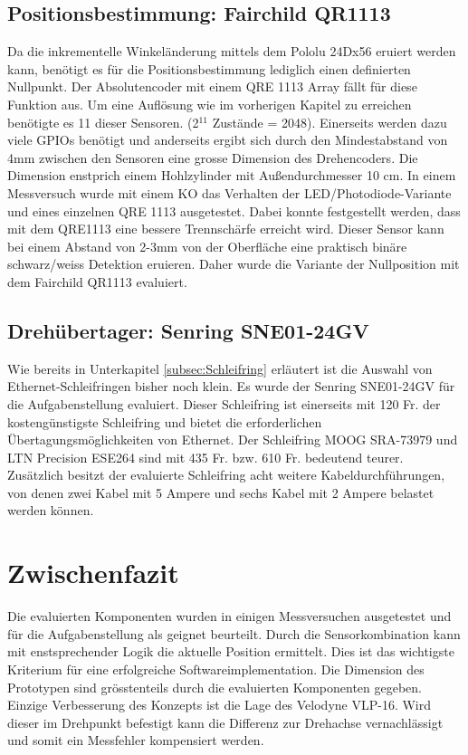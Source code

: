 \subsection{Positionsbestimmung: Fairchild QR1113}
\label{subsec:QR1113}
Da die inkrementelle Winkeländerung mittels dem Pololu 24Dx56 eruiert werden kann, benötigt es für die Positionsbestimmung lediglich einen definierten Nullpunkt. Der Absolutencoder mit einem QRE 1113 Array fällt für diese Funktion aus. Um eine Auflösung wie im vorherigen Kapitel zu erreichen benötigte es 11 dieser Sensoren. (2$^{11}$ Zustände = 2048). Einerseits werden dazu viele GPIOs benötigt und anderseits ergibt sich durch den Mindestabstand von 4mm zwischen den Sensoren eine grosse Dimension des Drehencoders. Die Dimension enstprich einem Hohlzylinder mit Außendurchmesser 10 cm.
In einem Messversuch wurde mit einem \ac{KO} das Verhalten der LED/Photodiode-Variante und eines einzelnen QRE 1113 ausgetestet. Dabei konnte festgestellt werden, dass mit dem QRE1113 eine bessere Trennschärfe erreicht wird. Dieser Sensor kann bei einem Abstand von 2-3mm von der Oberfläche eine praktisch binäre schwarz/weiss Detektion eruieren. Daher wurde die Variante der Nullposition mit dem Fairchild QR1113 evaluiert.

\subsection{Drehübertager: Senring SNE01-24GV}
\label{subsec:SNE01}
Wie bereits in Unterkapitel \ref{subsec:Schleifring} erläutert ist die Auswahl von Ethernet-Schleifringen bisher noch klein. Es wurde der Senring SNE01-24GV für die Aufgabenstellung evaluiert. Dieser Schleifring ist einerseits mit 120 Fr. der kostengünstigste Schleifring und bietet die erforderlichen Übertagungsmöglichkeiten von Ethernet. Der Schleifring MOOG SRA-73979 und LTN Precision ESE264 sind mit 435 Fr. bzw. 610 Fr. bedeutend teurer. Zusätzlich besitzt der evaluierte Schleifring acht weitere Kabeldurchführungen, von denen zwei Kabel mit 5 Ampere und sechs Kabel mit 2 Ampere belastet werden können.\cite{senring}

\section{Zwischenfazit}
\label{ZwischenfazitKonz}
Die evaluierten Komponenten wurden in einigen Messversuchen ausgetestet und für die Aufgabenstellung als geignet beurteilt. Durch die Sensorkombination kann mit enstsprechender Logik die aktuelle Position ermittelt. Dies ist das wichtigste Kriterium für eine erfolgreiche Softwareimplementation. Die Dimension des Prototypen sind grösstenteils durch die evaluierten Komponenten gegeben. Einzige Verbesserung des Konzepts ist die Lage des Velodyne VLP-16. Wird dieser im Drehpunkt befestigt kann die Differenz zur Drehachse vernachlässigt und somit ein Messfehler kompensiert werden.



